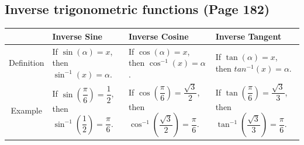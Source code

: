 \subsection{Inverse trigonometric functions (Page 182)}

\renewcommand{\arraystretch}{2.8}
\begin{table}[H]
    \centering
    \begin{tabular}{|c|p{4cm}|p{4cm}|p{4cm}|}
        \hline
        & Inverse Sine & Inverse Cosine & Inverse Tangent\\
        \hline
        Definition & If $\sin(\alpha) = x$, then $\sin^{-1}(x) = \alpha$. &  If $\cos(\alpha) = x$, then $\cos^{-1}(x) = \alpha$. &  If $\tan(\alpha) = x$, then $tan^{-1}(x) = \alpha$.\\\hline
        Example & If $\sin\left(\dfrac{\pi}{6}\right) = \dfrac{1}{2}$, then $\sin^{-1}\left(\dfrac{1}{2}\right) = \dfrac{\pi}{6}$. 
        & If $\cos\left(\dfrac{\pi}{6}\right) = \dfrac{\sqrt {3}}{2}$, then $\cos^{-1}\left(\dfrac{\sqrt {3}}{2}\right) = \dfrac{\pi}{6}$.
        & If $\tan\left(\dfrac{\pi}{6}\right) = \dfrac{\sqrt {3}}{3}$, then $\tan^{-1}\left(\dfrac{\sqrt {3}}{3}\right) = \dfrac{\pi}{6}$.\\\hline
    \end{tabular}\label{tab:table2}
\end{table}